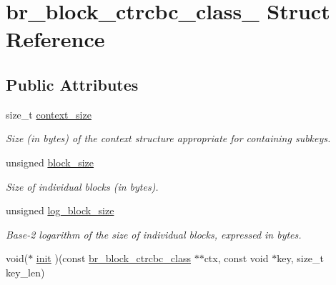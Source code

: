 \hypertarget{structbr__block__ctrcbc__class__}{}\section{br\+\_\+block\+\_\+ctrcbc\+\_\+class\+\_\+ Struct Reference}
\label{structbr__block__ctrcbc__class__}
\subsection*{Public Attributes}
\begin{DoxyCompactItemize}
\item 
\mbox{\label{structbr__block__ctrcbc__class___a74b9fae6a21c846f9146f6c5d735212c}} 
size\+\_\+t \hyperlink{structbr__block__ctrcbc__class___a74b9fae6a21c846f9146f6c5d735212c}{context\+\_\+size}
\begin{DoxyCompactList}\small\item\em Size (in bytes) of the context structure appropriate for containing subkeys. \end{DoxyCompactList}\item 
\mbox{\label{structbr__block__ctrcbc__class___af15e472287ac70fcfe2fa31825e22214}} 
unsigned \hyperlink{structbr__block__ctrcbc__class___af15e472287ac70fcfe2fa31825e22214}{block\+\_\+size}
\begin{DoxyCompactList}\small\item\em Size of individual blocks (in bytes). \end{DoxyCompactList}\item 
\mbox{\label{structbr__block__ctrcbc__class___a968f2abc1b0035034294633e30c69ab7}} 
unsigned \hyperlink{structbr__block__ctrcbc__class___a968f2abc1b0035034294633e30c69ab7}{log\+\_\+block\+\_\+size}
\begin{DoxyCompactList}\small\item\em Base-\/2 logarithm of the size of individual blocks, expressed in bytes. \end{DoxyCompactList}\item 
void($\ast$ \hyperlink{structbr__block__ctrcbc__class___ae9fc5896bb00f38332ff72960c73d397}{init} )(const \hyperlink{bearssl__block_8h_acc35dad952fda67b68df0b107fe26f0b}{br\+\_\+block\+\_\+ctrcbc\+\_\+class} $\ast$$\ast$ctx, const void $\ast$key, size\+\_\+t key\+\_\+len)
$$
\end{DoxyCompactItemize}
